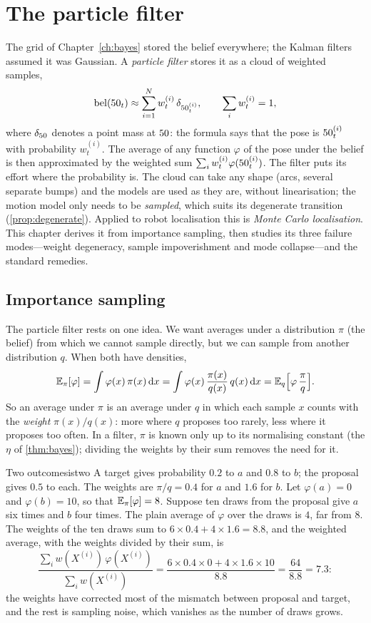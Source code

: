 \chapter{The particle filter}
\label{ch:particle}

The grid of Chapter~\ref{ch:bayes} stored the belief everywhere; the
Kalman filters assumed it was Gaussian. A \emph{particle filter} stores it
as a cloud of weighted samples,
\[
  \operatorname{bel}(50_t)\approx\sum_{i=1}^Nw_t^{(i)}\,\delta_{50_t^{(i)}},\qquad
  \sum_iw_t^{(i)}=1,
\]
where $\delta_{50}$ denotes a point mass at $50$: the formula says that the
pose is $50_t^{(i)}$ with probability $w_t^{(i)}$. The average of any
function $\varphi$ of the pose under the belief is then approximated by
the weighted sum $\sum_iw_t^{(i)}\varphi(50_t^{(i)})$. The filter puts its
effort where the probability is. The cloud can take any shape
(arcs, several separate bumps) and the models are used as they are,
without linearisation; the motion model only needs to be \emph{sampled},
which suits its degenerate transition (\cref{prop:degenerate}). Applied to
robot localisation this is \emph{Monte Carlo localisation}. This chapter
derives it from importance sampling, then studies its three failure
modes---weight degeneracy, sample impoverishment and mode collapse---and
the standard remedies.

\section{Importance sampling}

The particle filter rests on one idea. We want averages under a
distribution $\pi$ (the belief) from which we cannot sample directly, but
we can sample from another distribution $q$. When both have densities,
\[
  \mathbb{E}_\pi[\varphi]=\int\varphi(x)\,\pi(x)\,\mathrm dx
  =\int\varphi(x)\,\frac{\pi(x)}{q(x)}\,q(x)\,\mathrm dx
  =\mathbb{E}_q\Bigl[\varphi\,\frac\pi q\Bigr].
\]
So an average under $\pi$ is an average under $q$ in which each sample $x$
counts with the \emph{weight} $\pi(x)/q(x)$: more where $q$ proposes too
rarely, less where it proposes too often. In a filter, $\pi$ is known only
up to its normalising constant (the $\eta$ of \cref{thm:bayes}); dividing
the weights by their sum removes the need for it.

\begin{example}{Two outcomes}{istwo}
A target gives probability $0.2$ to $a$ and $0.8$ to $b$; the proposal
gives $0.5$ to each. The weights are $\pi/q=0.4$ for $a$ and $1.6$ for $b$.
Let $\varphi(a)=0$ and $\varphi(b)=10$, so that $\mathbb{E}_\pi[\varphi]=8$.
Suppose ten draws from the proposal give $a$ six times and $b$ four times.
The plain average of $\varphi$ over the draws is $4$, far from $8$. The weights of the ten draws sum to $6\times0.4+4\times1.6=8.8$, and the
weighted average, with the weights divided by their sum, is
\[
  \frac{\sum_iw(X^{(i)})\,\varphi(X^{(i)})}{\sum_iw(X^{(i)})}
  =\frac{6\times0.4\times0+4\times1.6\times10}{8.8}=\frac{64}{8.8}=7.3 :
\] the weights have corrected
most of the mismatch between proposal and target, and the rest is sampling
noise, which vanishes as the number of draws grows.
\end{example}

